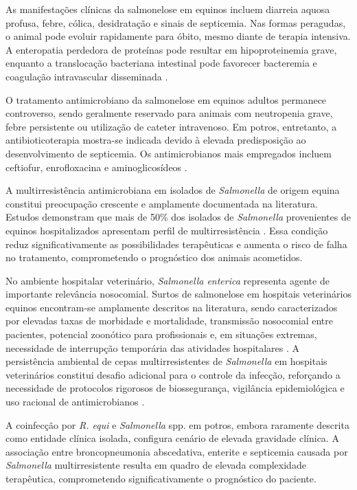As manifestações clínicas da salmonelose em equinos incluem diarreia
aquosa profusa, febre, cólica, desidratação e sinais de septicemia. Nas
formas peragudas, o animal pode evoluir rapidamente para óbito, mesmo
diante de terapia intensiva. A enteropatia perdedora de proteínas pode
resultar em hipoproteinemia grave, enquanto a translocação bacteriana
intestinal pode favorecer bacteremia e coagulação intravascular
disseminada \cite{MerckVet2025}.

O tratamento antimicrobiano da salmonelose em equinos adultos permanece
controverso, sendo geralmente reservado para animais com neutropenia
grave, febre persistente ou utilização de cateter intravenoso. Em
potros, entretanto, a antibioticoterapia mostra-se indicada devido à
elevada predisposição ao desenvolvimento de septicemia. Os
antimicrobianos mais empregados incluem ceftiofur, enrofloxacina e
aminoglicosídeos \cite{Cummings2016}.

A multirresistência antimicrobiana em isolados de \textit{Salmonella} de
origem equina constitui preocupação crescente e amplamente documentada
na literatura. Estudos demonstram que mais de 50\% dos isolados de
\textit{Salmonella} provenientes de equinos hospitalizados apresentam
perfil de multirresistência \cite{Cummings2016}. Essa condição reduz
significativamente as possibilidades terapêuticas e aumenta o risco de
falha no tratamento, comprometendo o prognóstico dos animais acometidos.

No ambiente hospitalar veterinário, \textit{Salmonella enterica}
representa agente de importante relevância nosocomial. Surtos de
salmonelose em hospitais veterinários equinos encontram-se amplamente
descritos na literatura, sendo caracterizados por elevadas taxas de
morbidade e mortalidade, transmissão nosocomial entre pacientes,
potencial zoonótico para profissionais e, em situações extremas,
necessidade de interrupção temporária das atividades hospitalares
\cite{SozaOssandon2020, Schott2001}. A persistência
ambiental de cepas multirresistentes de \textit{Salmonella} em hospitais
veterinários constitui desafio adicional para o controle da infecção,
reforçando a necessidade de protocolos rigorosos de biossegurança,
vigilância epidemiológica e uso racional de antimicrobianos
\cite{SozaOssandon2020}.

A coinfecção por \textit{R. equi} e \textit{Salmonella} spp. em potros,
embora raramente descrita como entidade clínica isolada, configura
cenário de elevada gravidade clínica. A associação entre broncopneumonia
abscedativa, enterite e septicemia causada por \textit{Salmonella}
multirresistente resulta em quadro de elevada complexidade terapêutica,
comprometendo significativamente o prognóstico do paciente.

